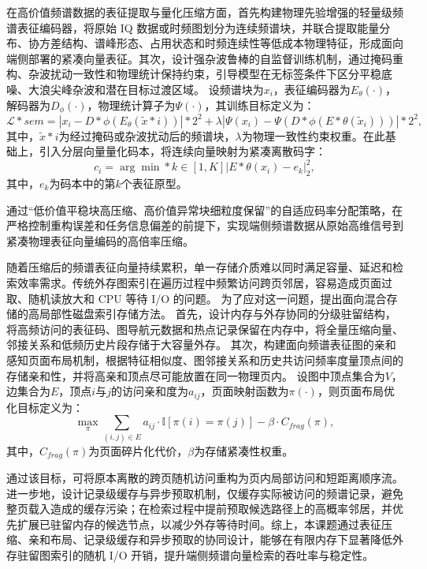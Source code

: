 在高价值频谱数据的表征提取与量化压缩方面，首先构建物理先验增强的轻量级频谱表征编码器，将原始 IQ 数据或时频图划分为连续频谱块，并联合提取能量分布、协方差结构、谱峰形态、占用状态和时频连续性等低成本物理特征，形成面向端侧部署的紧凑向量表征。其次，设计强杂波鲁棒的自监督训练机制，通过掩码重构、杂波扰动一致性和物理统计保持约束，引导模型在无标签条件下区分平稳底噪、大浪尖峰杂波和潜在目标过渡区域。
设频谱块为$x_i$，表征编码器为$E_\theta(\cdot)$，解码器为$D_\phi(\cdot)$，物理统计算子为$\Psi(\cdot)$，其训练目标定义为：
\begin{equation}
	\mathcal{L}*{\textit{sem}}=|x_i-D*\phi(E_\theta(\widetilde{x}*i))|*2^2
	+\lambda|\Psi(x_i)-\Psi(D*\phi(E*\theta(\widetilde{x}_i)))|*2^2,
\end{equation}
其中，$\widetilde{x}*i$为经过掩码或杂波扰动后的频谱块，$\lambda$为物理一致性约束权重。在此基础上，引入分层向量量化码本，将连续向量映射为紧凑离散码字：
\begin{equation}
	c_i=\arg\min*{k\in[1,K]}|E*\theta(x_i)-e_k|_2^2,
\end{equation}
其中，$e_k$为码本中的第$k$个表征原型。

通过“低价值平稳块高压缩、高价值异常块细粒度保留”的自适应码率分配策略，在严格控制重构误差和任务信息偏差的前提下，实现端侧频谱数据从原始高维信号到紧凑物理表征向量编码的高倍率压缩。

随着压缩后的频谱表征向量持续累积，单一存储介质难以同时满足容量、延迟和检索效率需求。传统外存图索引在遍历过程中频繁访问跨页邻居，容易造成页面过取、随机读放大和 CPU 等待 I/O 的问题。
为了应对这一问题，提出面向混合存储的高局部性磁盘索引存储方法。
首先，设计内存与外存协同的分级驻留结构，将高频访问的表征码、图导航元数据和热点记录保留在内存中，将全量压缩向量、邻接关系和低频历史片段存储于大容量外存。
其次，构建面向频谱表征图的亲和感知页面布局机制，根据特征相似度、图邻接关系和历史共访问频率度量顶点间的存储亲和性，并将高亲和顶点尽可能放置在同一物理页内。
设图中顶点集合为$V$，边集合为$E$，顶点$i$与$j$的访问亲和度为$a_{ij}$，页面映射函数为$\pi(\cdot)$，则页面布局优化目标定义为：
\begin{equation}
	\max_{\pi}\sum_{(i,j)\in E}a_{ij}\cdot\mathbb{I}[\pi(i)=\pi(j)]-\beta\cdot C_{\textit{frag}}(\pi),
\end{equation}
其中，$C_{\textit{frag}}(\pi)$为页面碎片化代价，$\beta$为存储紧凑性权重。

通过该目标，可将原本离散的跨页随机访问重构为页内局部访问和短距离顺序流。进一步地，设计记录级缓存与异步预取机制，仅缓存实际被访问的频谱记录，避免整页载入造成的缓存污染；在检索过程中提前预取候选路径上的高概率邻居，并优先扩展已驻留内存的候选节点，以减少外存等待时间。综上，本课题通过表征压缩、亲和布局、记录级缓存和异步预取的协同设计，能够在有限内存下显著降低外存驻留图索引的随机 I/O 开销，提升端侧频谱向量检索的吞吐率与稳定性。

